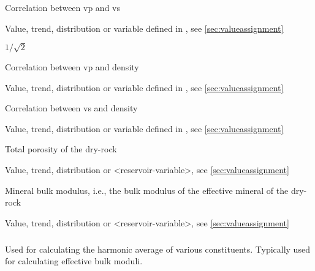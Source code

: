 {
 \slist
   \item \Description Correlation between vp and vs
   \item \Argument Value, trend, distribution or variable defined in , see \autoref{sec:valueassignment}
   \item \Default $1/\sqrt{2}$
 \elist

 \slist
   \item \Description Correlation between vp and density
   \item \Argument Value, trend, distribution or variable defined in , see \autoref{sec:valueassignment}
   \item {}
 \elist

 \slist
   \item \Description Correlation between vs and density
   \item \Argument Value, trend, distribution or variable defined in , see \autoref{sec:valueassignment}
   \item {}
 \elist

 \slist
   \item \Description Total porosity of the dry-rock
   \item \Argument Value, trend, distribution or <reservoir-variable>, see \autoref{sec:valueassignment}
   \item \Default 
 \elist

 \slist
   \item \Description Mineral bulk modulus, i.e., the bulk modulus of the effective mineral of the dry-rock
   \item \Argument Value, trend, distribution or <reservoir-variable>, see \autoref{sec:valueassignment}
   \item \Default 
 \elist

\subparagraph{}
 \slist
   \item \Description Used for calculating the harmonic average of various constituents. Typically used for calculating effective bulk moduli. 
   \item \Argument
   \item \Default 
 \elist

}
